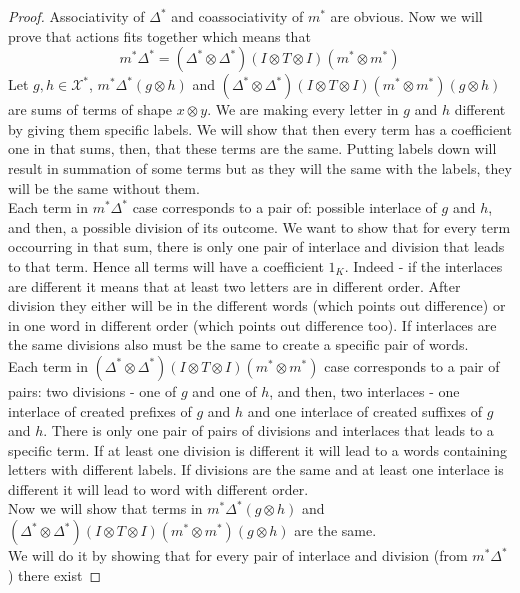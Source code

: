 \documentclass[a4paper, 12pt]{report}
\begin{document}
\begin{proof}
Associativity of $\Delta^*$ and coassociativity of $m^*$ are obvious.
Now we will prove that actions fits together which means that
\begin{equation*}
m^*\Delta^* = (\Delta^*\otimes \Delta^*)(I \otimes T \otimes I)(m^* \otimes m^*)
\end{equation*}
Let $g, h \in \mathcal{X}^*$, $m^*\Delta^*(g \otimes h)$ and $(\Delta^*\otimes \Delta^*)(I \otimes T \otimes
I)(m^* \otimes m^*)(g \otimes h)$ are sums of terms of shape $x \otimes y$. We are making every letter in
$g$ and $h$ different by giving them specific labels. We will show that then every term has
a coefficient one in that sums, then, that these terms are the same. Putting labels down will result in
summation of some terms but as they will the same with the labels, they will be the same without them.\\
\indent Each term in $m^*\Delta^*$ case corresponds to a pair of: possible interlace of $g$ and $h$, and
then, a possible division of its outcome. We want to show that for every term occourring in that sum, there
is only one pair of interlace and division that leads to that term. Hence all terms will have a coefficient
$1_K$. Indeed - if the interlaces are different it means that at least two letters are in different order.
After division they either will be in the different words (which points out difference) or in one word in
different order (which points out difference too). If interlaces are the same divisions also must be the same
to create a specific pair of words. \\
\indent Each term in $(\Delta^*\otimes \Delta^*)(I \otimes T \otimes I)(m^* \otimes m^*)$ case corresponds to
a pair of pairs: two divisions - one of $g$ and one of $h$, and then, two interlaces - one interlace of
created prefixes of $g$ and $h$ and one interlace of created suffixes of $g$ and $h$.
There is only one pair of pairs of divisions and interlaces that leads to a specific term. If at least one
division is different it will lead to a words containing letters with different labels. If divisions are
the same and at least one interlace is different it will lead to word with different order. \\
\indent Now we will show that terms in $m^*\Delta^*(g \otimes h)$ and $(\Delta^*\otimes \Delta^*)(I \otimes T
\otimes I)(m^* \otimes m^*)(g \otimes h)$ are the same. \\
We will do it by showing that for every pair of interlace and division (from $m^*\Delta^*$) there exist

\end{proof}
\end{document}
